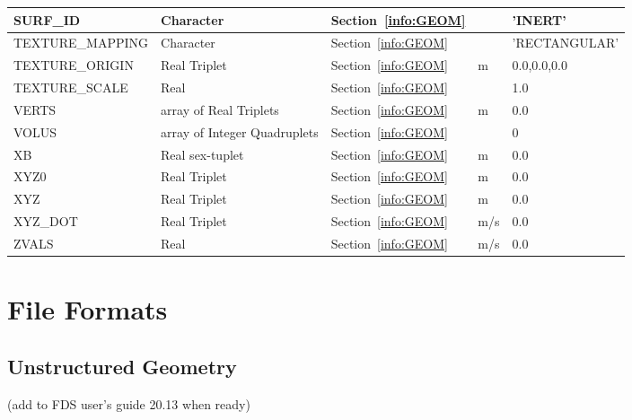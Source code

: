 \documentclass[12pt]{article}
\begin{document}
\begin{longtable}{@{\extracolsep{\fill}}|l|l|l|l|l|}
{\ct SURF\_ID}     & Character              & Section~\ref{info:GEOM}            &           &  {\ct 'INERT'}           \\ \hline
{\ct TEXTURE\_MAPPING}& Character           & Section~\ref{info:GEOM}            &           & {\ct 'RECTANGULAR'}      \\ \hline
{\ct TEXTURE\_ORIGIN} & Real Triplet        & Section~\ref{info:GEOM}            &   m       &   0.0,0.0,0.0            \\ \hline
{\ct TEXTURE\_SCALE}& Real                  & Section~\ref{info:GEOM}            &           &   1.0                    \\ \hline
{\ct VERTS}        & array of Real Triplets & Section~\ref{info:GEOM}            &   m       &   0.0                    \\ \hline
{\ct VOLUS}        & array of Integer Quadruplets     & Section~\ref{info:GEOM}  &           &    0                     \\ \hline
{\ct XB}           & Real sex-tuplet        & Section~\ref{info:GEOM}            &   m       &   0.0                    \\ \hline
{\ct XYZ0}         & Real Triplet           & Section~\ref{info:GEOM}            &   m       &   0.0                    \\ \hline
{\ct XYZ}          & Real Triplet           & Section~\ref{info:GEOM}            &   m       &   0.0                    \\ \hline
{\ct XYZ\_DOT}     & Real Triplet           & Section~\ref{info:GEOM}            &   m/s     &   0.0                    \\ \hline
{\ct ZVALS}        & Real                   & Section~\ref{info:GEOM}            &   m/s     &   0.0                    \\ \hline

\end{longtable}


\vspace{\baselineskip}

\section{File Formats}

\subsection{Unstructured Geometry}
\label{out:GEOMETRY}

(add to FDS user's guide 20.13 when ready)
\end{document}
